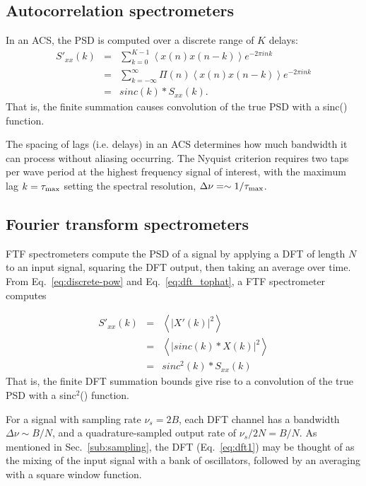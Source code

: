 \documentclass{ws-rv961x669}
\begin{document}
\subsection{Autocorrelation spectrometers}\label{sub:acs}

In an ACS, the PSD is computed over a discrete range of $K$ delays:
\begin{eqnarray}
S'_{xx}(k) & = & \sum_{k=0}^{K-1}\left\langle x(n)x(n-k)\right\rangle e^{-2\pi ink} \\
          & = &  \sum_{k=-\infty}^{\infty}\Pi(n)\left\langle x(n)x(n-k)\right\rangle e^{-2\pi ink} \\
          & = &  sinc(k) * S_{xx}(k).\label{eq:acs_sinc}
\end{eqnarray}
That is, the finite summation causes convolution of the true PSD with a sinc() function. 

The spacing of lags (i.e. delays) in an ACS determines how much bandwidth it can process without aliasing occurring. The Nyquist criterion requires two taps per wave period at the highest frequency signal of interest, with the maximum lag $k=\tau_{\rm{max}}$ setting the spectral resolution, $\Delta\nu = \sim 1 / \tau_{\rm{max}}$.

\subsection{Fourier transform spectrometers}\label{sub:ftf}

FTF spectrometers compute the PSD of a signal by applying a DFT of length $N$ to an input signal, squaring the DFT output, then taking an average over time. From Eq.~\ref{eq:discrete-pow} and Eq.~\ref{eq:dft_tophat}, a FTF spectrometer computes

\begin{eqnarray}
	S'_{xx}(k) & = & \left\langle \left|X'(k)\right|^{2}\right\rangle \\
	    & = & \left\langle \left|sinc(k)*X(k)\right|^{2}\right\rangle \\
	    & = & sinc^2(k) * S_{xx}(k) \label{eq:ftf_sinc}
\end{eqnarray}
That is, the finite DFT summation bounds give rise to a convolution of the true PSD with a sinc$^2$() function.

For a signal with sampling rate $\nu_s=2B$, each DFT channel has a bandwidth $\Delta\nu \sim B/N$, and a quadrature-sampled output rate of $\nu_s/2N = B/N$. As mentioned in Sec.~\ref{sub:sampling}, the DFT (Eq.~\ref{eq:dft1}) may be thought of as the mixing of the input signal with a bank of oscillators, followed by an averaging with a square window function. 
\end{document}
